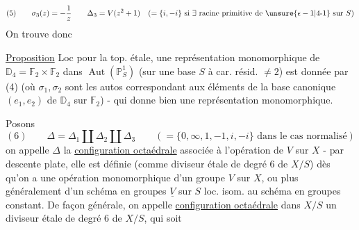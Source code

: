 \[
(5)\qquad\sigma_3(z)=-\frac1z\qquad
\Delta_3=V(z^2+1)\quad(=\{i,-i\}\text{ si }\exists\text{ racine primitive de }\unsure{\epsilon-1|4\text{-}1}\text{ sur }S)
\]
On trouve donc

\uline{Proposition} Loc pour la top. étale, une représentation monomorphique de $\mathbb D_4=\mathbb F_2\times\mathbb F_2$ dans $\operatorname{Aut}(\mathbb P^1_S)$ (sur une base $S$ à car. résid. $\ne2$) est donnée par (4) (où $\sigma_1,\sigma_2$ sont les autos correspondant aux éléments de la base canonique $(e_1,e_2)$ de $\mathbb D_4$ sur $\mathbb F_2$) - qui donne bien une représentation monomorphique.

Posons
\[
(6)\qquad\Delta=\Delta_1\amalg\Delta_2\amalg\Delta_3
\qquad(=\{0,\infty,1,-1,i,-i\}\text{ dans le cas normalisé})
\]
on appelle $\Delta$ la \uline{configuration octaédrale} associée à l'opération de $V$ sur \deleted{$\unsure{\leftarrow}$} $X$ - par descente plate, elle est définie (comme diviseur étale de degré $6$ de $X/S$) dès qu'on a une opération monomorphique  d'un groupe $V$  sur $X$, ou plus généralement d'un schéma en groupes $\underline V$ sur $S$ loc. isom. au schéma en groupes constant.  De façon générale, on appelle \uline{configuration octaédrale} dans $X/S$ un diviseur étale de degré $6$ de $X/S$, qui soit
